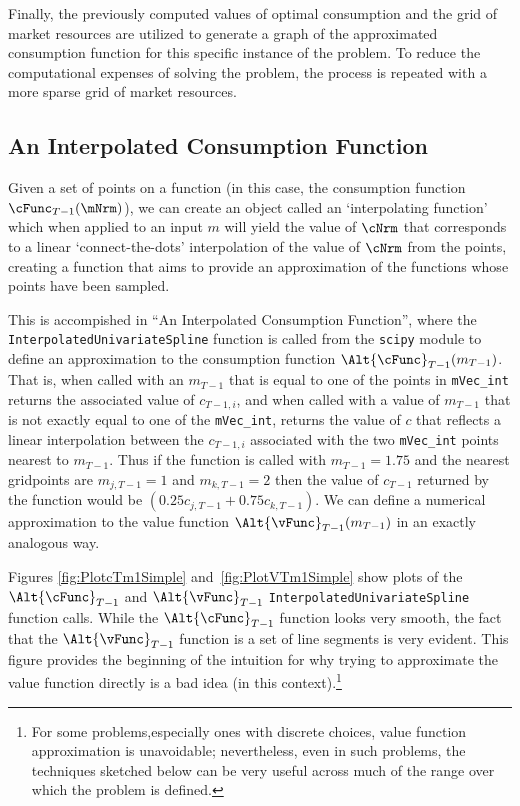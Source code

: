 \documentclass[titlepage, headings=optiontotocandhead]{\econtex}
\begin{document}
Finally, the previously computed values of optimal consumption and the grid of market resources are utilized to generate a graph of the approximated consumption function for this specific instance of the problem. To reduce the computational expenses of solving the problem, the process is repeated with a more sparse grid of market resources.


\hypertarget{an-interpolated-consumption-function}{}
\subsection{An Interpolated Consumption Function} \label{subsec:LinInterp}

Given a set of points on a function (in this case, the consumption function $\cFunc_{T-1}(\mNrm)$), we can create an object called an `interpolating function' which when applied to an input ${m}$ will yield the value of $\cNrm$ that corresponds to a linear `connect-the-dots' interpolation of the value of $\cNrm$ from the points, creating a function that aims to provide an approximation of the functions whose points have been sampled.

This is accompished in ``An Interpolated Consumption Function'', where the \texttt{InterpolatedUnivariateSpline} function is called from the \texttt{scipy} module to define an approximation to the consumption function $\Alt{\cFunc}_{T-1}({m}_{T-1})$. That is, when called with an ${m}_{T-1}$ that is equal to one of the points in \texttt{mVec\_int} returns the associated value of ${c}_{T-1,i}$, and when called with a value of ${m}_{T-1}$ that is not exactly equal to one of the \texttt{mVec\_int}, returns the value of ${c}$ that reflects a linear interpolation between the ${c}_{T-1,i}$ associated with the two \texttt{mVec\_int} points nearest to ${m}_{T-1}$.  Thus if the function is called with ${m}_{T-1} = 1.75$ and the nearest gridpoints  are ${m}_{j,T-1}=1$ and ${m}_{k,T-1}=2$ then the value of ${c}_{T-1}$ returned by the function would be $(0.25 {c}_{j,T-1}+0.75 {c}_{k,T-1})$. We can define a numerical approximation to the value function $\Alt{\vFunc}_{T-1}({m}_{T-1})$ in an exactly analogous way.


Figures \ref{fig:PlotcTm1Simple} and~\ref{fig:PlotVTm1Simple} show
plots of the $\Alt{\cFunc}_{T-1}$ and $\Alt{\vFunc}_{T-1}$
\texttt{InterpolatedUnivariateSpline} function calls. While the $\Alt{\cFunc}_{T-1}$ function looks very smooth, the fact that the $\Alt{\vFunc}_{T-1}$ function is a set of line segments is very evident.  This figure provides the beginning of the intuition for why trying to approximate the value function directly is a bad idea (in this context).\footnote{For some problems,especially ones with discrete choices, value function approximation is unavoidable; nevertheless, even in such problems, the techniques sketched below can be very useful across much of the range over which the problem is defined.}
\end{document}
